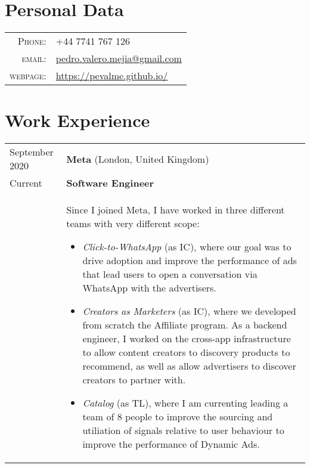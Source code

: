 \documentclass[a4paper,10pt]{article} %
\begin{document}
\pagestyle{empty} %




\par{\bigskip\par} %

\section{Personal Data}

\begin{tabular}{rl}
\textsc{Phone:} & +44 7741 767 126\\
\textsc{email:} & \href{mailto:pedro.valero.mejia@gmail.com}{pedro.valero.mejia@gmail.com} \\
\textsc{webpage:} & \href{https://pevalme.github.io/}{https://pevalme.github.io/}\\
\end{tabular}

\section{Work Experience}

\begin{tabular}{p{2.5cm}p{13.2cm}}
{\small September 2020} & \textbf{Meta} (London, United Kingdom) \\
{\small Current} & \textcolor{azureblue}{\textbf{Software Engineer}} \hfill  \\
& Since I joined Meta, I have worked in three different teams with very different scope:
\begin{itemize}
\item \emph{Click-to-WhatsApp} (as IC), where our goal was to drive adoption and improve the performance of ads that lead users to open a conversation via WhatsApp with the advertisers.
\item \emph{Creators as Marketers} (as IC), where we developed from scratch the Affiliate program. As a backend engineer, I worked on the cross-app infrastructure to allow content creators to
discovery products to recommend, as well as allow advertisers to discover creators to partner with.
\item \emph{Catalog} (as TL), where I am currenting leading a team of 8 people to improve the sourcing and utiliation of signals relative to user behaviour to improve the performance of Dynamic Ads.\vspace*{-\baselineskip}
\end{itemize}
\end{tabular}
\end{document}
